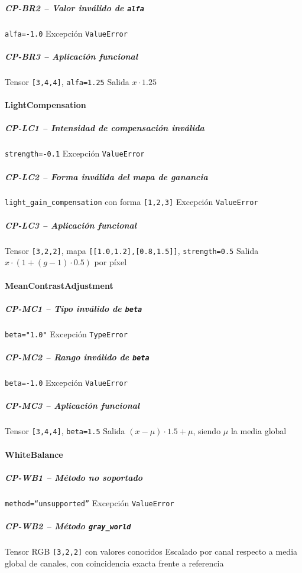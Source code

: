 \subparagraph{CP-BR2 -- Valor inválido de \texttt{alfa}}\label{cp:CP-BR2}
\testcasetable
{\texttt{alfa=-1.0}}
{Excepción \texttt{ValueError}}

\subparagraph{CP-BR3 -- Aplicación funcional}\label{cp:CP-BR3}
\testcasetable
{Tensor \texttt{[3,4,4]}, \texttt{alfa=1.25}}
{Salida $x\cdot 1.25$}

\paragraph{LightCompensation}
\subparagraph{CP-LC1 -- Intensidad de compensación inválida}\label{cp:CP-LC1}
\testcasetable
{\texttt{strength=-0.1}}
{Excepción \texttt{ValueError}}

\subparagraph{CP-LC2 -- Forma inválida del mapa de ganancia}\label{cp:CP-LC2}
\testcasetable
{\texttt{light\_gain\_compensation} con forma \texttt{[1,2,3]}}
{Excepción \texttt{ValueError}}

\subparagraph{CP-LC3 -- Aplicación funcional}\label{cp:CP-LC3}
\testcasetable
{Tensor \texttt{[3,2,2]}, mapa \texttt{[[1.0,1.2],[0.8,1.5]]}, \texttt{strength=0.5}}
{Salida $x\cdot(1 + (g-1)\cdot 0.5)$ por píxel}

\paragraph{MeanContrastAdjustment}
\subparagraph{CP-MC1 -- Tipo inválido de \texttt{beta}}\label{cp:CP-MC1}
\testcasetable
{\texttt{beta="1.0"}}
{Excepción \texttt{TypeError}}

\subparagraph{CP-MC2 -- Rango inválido de \texttt{beta}}\label{cp:CP-MC2}
\testcasetable
{\texttt{beta=-1.0}}
{Excepción \texttt{ValueError}}

\subparagraph{CP-MC3 -- Aplicación funcional}\label{cp:CP-MC3}
\testcasetable
{Tensor \texttt{[3,4,4]}, \texttt{beta=1.5}}
{Salida $(x-\mu)\cdot 1.5 + \mu$, siendo $\mu$ la media global}

\paragraph{WhiteBalance}
\subparagraph{CP-WB1 -- Método no soportado}\label{cp:CP-WB1}
\testcasetable
{\texttt{method=``unsupported''}}
{Excepción \texttt{ValueError}}

\subparagraph{CP-WB2 -- Método \texttt{gray\_world}}\label{cp:CP-WB2}
\testcasetable
{Tensor RGB \texttt{[3,2,2]} con valores conocidos}
{Escalado por canal respecto a media global de canales, con coincidencia exacta frente a referencia}

